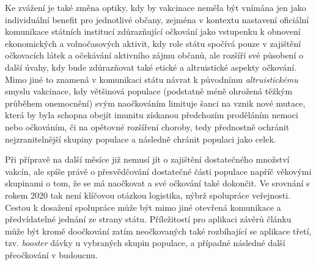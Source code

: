 Ke zvážení je také změna optiky, kdy by vakcinace neměla být vnímána jen jako individuální benefit pro jednotlivé občany, zejména v kontextu nastavení oficiální komunikace státních institucí zdůrazňující očkování jako vstupenku k obnovení ekonomických a volnočasových aktivit, kdy role státu spočívá pouze v zajištění očkovacích látek a očekávání aktivního zájmu občanů, ale rozšíří své působení o další úvahy, kdy bude zdůrazňovat také etické a altruistické aspekty očkování. %
Mimo jiné to znamená v komunikaci státu návrat k původnímu \emph{altruistickému} smyslu vakcinace, kdy většinová populace (podstatně méně ohrožená těžkým průběhem onemocnění) svým naočkováním limituje šanci na vznik nové mutace, která by byla schopna obejít imunitu získanou předchozím proděláním nemoci nebo očkováním, či na opětovné rozšíření choroby, tedy přednostně ochránit nejzranitelnější skupiny populace a následně chránit populaci jako celek. 


Při přípravě na další měsíce již nemusí jít o zajištění dostatečného množství vakcín, ale spíše právě o přesvědčování dostatečné části populace napříč věkovými skupinami o tom, že se má naočkovat a své očkování také dokončit. Ve srovnání s rokem 2020 tak není klíčovou otázkou logistika, nýbrž spolupráce veřejnosti. Cestou k dosažení spolupráce může být mimo jiné otevřená komunikace a předvídatelné jednání ze strany státu. Příležitostí pro aplikaci závěrů článku může být kromě doočkování zatím neočkovaných také rozbíhající se aplikace třetí, tzv. \emph{booster} dávky u vybraných skupin populace, a případné následné další přeočkování v budoucnu. 







